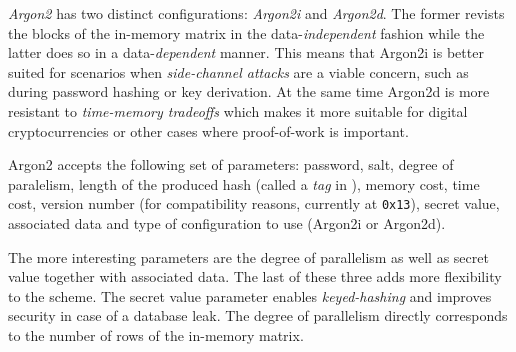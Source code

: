 \emph{Argon2} has two distinct configurations: \emph{Argon2i} and \emph{Argon2d}. The former revists the blocks of the in-memory matrix in the data-\emph{independent} fashion while the latter does so in a data-\emph{dependent} manner. This means that Argon2i is better suited for scenarios when \emph{side-channel attacks} are a viable concern, such as during password hashing or key derivation. At the same time Argon2d is more resistant to \emph{time-memory tradeoffs} which makes it more suitable for digital cryptocurrencies or other cases where proof-of-work is important.

Argon2 accepts the following set of parameters: password, salt, degree of paralelism, length of the produced hash (called a \emph{tag} in \cite{biryukov:2015:argon2}), memory cost, time cost, version number (for compatibility reasons, currently at \texttt{0x13}), secret value, associated data and type of configuration to use (Argon2i or Argon2d).

The more interesting parameters are the degree of parallelism as well as secret value together with associated data. The last of these three adds more flexibility to the scheme. The secret value parameter enables \emph{keyed-hashing} and improves security in case of a database leak. The degree of parallelism directly corresponds to the number of rows of the in-memory matrix.
